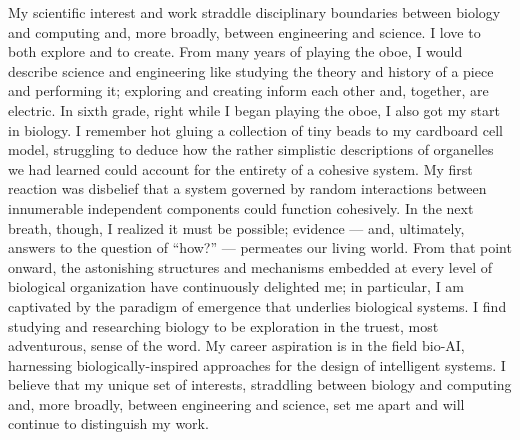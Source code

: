 
My scientific interest and work straddle disciplinary boundaries between biology and computing and, more broadly, between engineering and science.
I love to both explore and to create.
From many years of playing the oboe, I would describe science and engineering like studying the theory and history of a piece and performing it; exploring and creating inform each other and, together, are electric.
In sixth grade, right while I began playing the oboe, I also got my start in biology.
I remember hot gluing a collection of tiny beads to my cardboard cell model, struggling to deduce how the rather simplistic descriptions of organelles we had learned could account for the entirety of a cohesive system.
My first reaction was disbelief that a system governed by random interactions between innumerable independent components could function cohesively.
In the next breath, though, I realized it must be possible; evidence --- and, ultimately, answers to the question of ``how?'' --- permeates our living world.
From that point onward, the astonishing structures and mechanisms embedded at every level of biological organization have continuously delighted me;
in particular, I am captivated by the paradigm of emergence that underlies biological systems.
I find studying and researching biology to be exploration in the truest, most adventurous, sense of the word.
My career aspiration is in the field bio-AI, harnessing biologically-inspired approaches for the design of intelligent systems.
I believe that my unique set of interests, straddling between biology and computing and, more broadly, between engineering and science, set me apart and will continue to distinguish my work.
